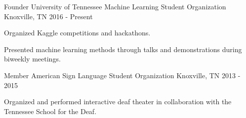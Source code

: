 \begin{cventries}
  \cventry
    {Founder}
    {University of Tennessee Machine Learning Student Organization}
    {Knoxville, TN}
    {2016 - Present}
    {
      \begin{cvitems}
        \item {Organized Kaggle competitions and hackathons.}
        \item {Presented machine learning methods through talks and demonstrations during biweekly meetings.}
      \end{cvitems}
    }
  \cventry
    {Member}
    {American Sign Language Student Organization}
    {Knoxville, TN}
    {2013 - 2015}
    {
      \begin{cvitems}
        \item {Organized and performed interactive deaf theater in collaboration with the Tennessee School for the Deaf.}
      \end{cvitems}
    }
\end{cventries}
